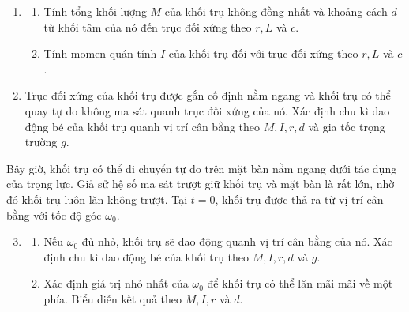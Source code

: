 \begin{enumerate}
  \item \begin{enumerate}
          \item Tính tổng khối lượng $M$ của khối trụ không đồng nhất và khoảng cách $d$ từ khối tâm của nó đến trục đối xứng theo $r, L$ và $c$.
          \item Tính momen quán tính $I$ của khối trụ đối với trục đối xứng theo $r, L$ và $c$.
        \end{enumerate}
  \item Trục đối xứng của khối trụ được gắn cố định nằm ngang và khối trụ có thể quay tự do không ma sát quanh trục đối xứng của nó. Xác định chu kì dao động bé của khối trụ quanh vị trí cân bằng theo $M, I, r, d$ và gia tốc trọng trường $g$.
\end{enumerate}
Bây giờ, khối trụ có thể di chuyển tự do trên mặt bàn nằm ngang dưới tác dụng của trọng lực. Giả sử hệ số ma sát trượt giữ khối trụ và mặt bàn là rất lớn, nhờ đó khối trụ luôn lăn không trượt. Tại $t=0$, khối trụ được thả ra từ vị trí cân bằng với tốc độ góc $\omega_0$.
\begin{enumerate}
  \setcounter{enumi}{2}
  \item \begin{enumerate}
          \item Nếu $\omega_0$ đủ nhỏ, khối trụ sẽ dao động quanh vị trí cân bằng của nó. Xác định chu kì dao động bé của khối trụ theo $M, I, r, d$ và $g$.
          \item Xác định giá trị nhỏ nhất của $\omega_0$ để khối trụ có thể lăn mãi mãi về một phía. Biểu diễn kết quả theo $M, I, r$ và $d$.
        \end{enumerate}
\end{enumerate}